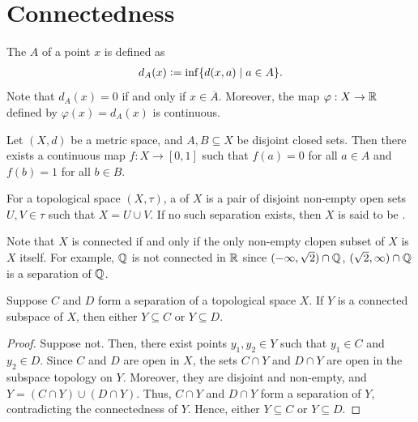 \section{Connectedness}

The  $A$ of a point $x$ is defined as
\begin{align}
    d_{A}(x) \vcentcolon= \inf \{d(x,a) \mid a \in A\}.
\end{align}
Note that $d_{A}(x) = 0$ if and only if $x \in \overline{A}$. Moreover, the map $\varphi : X \to \mathbb{R}$ defined by $\varphi(x) = d_{A}(x)$ is continuous.

\begin{lemma}
    Let $(X,d)$ be a metric space, and $A,B \subseteq X$ be disjoint closed sets. Then there exists a continuous map $f:X \to [0,1]$ such that $f(a) = 0$ for all $a \in A$ and $f(b) = 1$ for all $b \in B$.
\end{lemma}

\begin{definition}
    For a topological space $(X,\tau)$, a  of $X$ is a pair of disjoint non-empty open sets $U,V \in \tau$ such that $X = U \cup V$. If no such separation exists, then $X$ is said to be .
\end{definition}
Note that $X$ is connected if and only if the only non-empty clopen subset of $X$ is $X$ itself. For example, $\mathbb{Q}$ is not connected in $\mathbb{R}$ since $(-\infty, \sqrt{2}) \cap \mathbb{Q}$, $ (\sqrt{2}, \infty) \cap \mathbb{Q}$ is a separation of $\mathbb{Q}$.

\begin{lemma}
    Suppose $C$ and $D$ form a separation of a topological space $X$. If $Y$ is a connected subspace of $X$, then either $Y \subseteq C$ or $Y \subseteq D$.
\end{lemma}
\begin{proof}
    Suppose not. Then, there exist points $y_{1}, y_{2} \in Y$ such that $y_{1} \in C$ and $y_{2} \in D$. Since $C$ and $D$ are open in $X$, the sets $C \cap Y$ and $D \cap Y$ are open in the subspace topology on $Y$. Moreover, they are disjoint and non-empty, and $Y = (C \cap Y) \cup (D \cap Y)$. Thus, $C \cap Y$ and $D \cap Y$ form a separation of $Y$, contradicting the connectedness of $Y$. Hence, either $Y \subseteq C$ or $Y \subseteq D$.
\end{proof}

